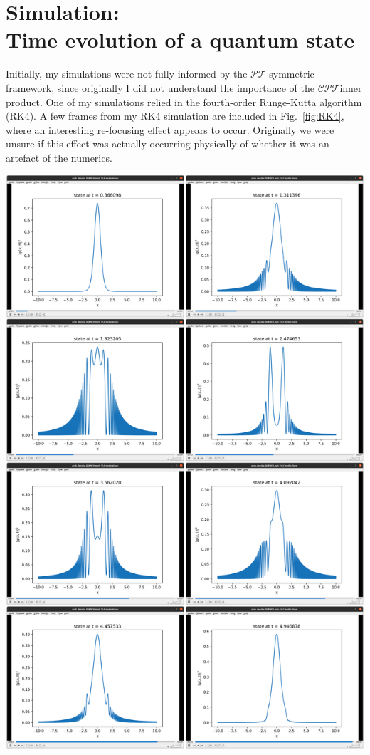 \documentclass[12pt, a4paper]{report}
\newenvironment{Figure}
    {\par\medskip\noindent\minipage{\linewidth}}
    {\endminipage\par\medskip}
\newcommand\PT{\(\mathcal{PT}\)}
\newcommand\CPT{\(\mathcal{CPT}\)}
\begin{document}
\section{Simulation:\\ Time evolution of a quantum state}\label{nonPTsim}
Initially, my simulations were not fully informed by the \PT-symmetric framework, since originally I did not understand the importance of the \CPT\:inner product.
One of my simulations relied in the fourth-order Runge-Kutta algorithm (RK4). A few frames from my RK4 simulation are included in Fig.~\ref{fig:RK4}, where an interesting re-focusing effect appears to occur. Originally we were unsure if this effect was actually occurring physically of whether it was an artefact of the numerics.
\begin{Figure}
\centering
\includegraphics[width=.7\linewidth]{probability_density_in_negquartic.pdf}
\label{fig:RK4}
\end{Figure}
\end{document}
